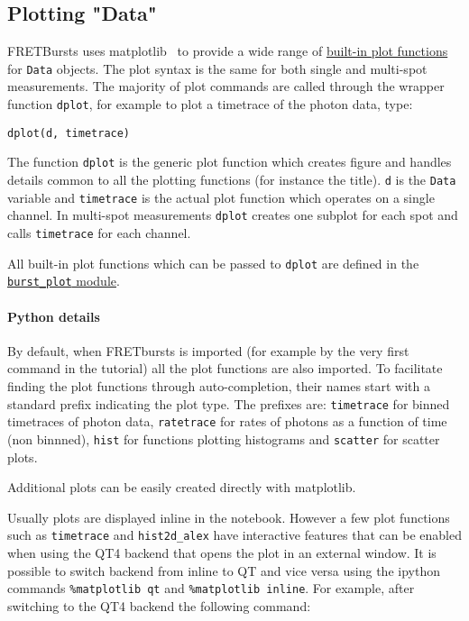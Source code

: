 \subsection{Plotting "Data"}
\label{sec:plotting}

FRETBursts uses matplotlib~\cite{2096e2a4-8f50-4519-bfb3-f796da201630} to
provide a wide range of
\href{http://fretbursts.readthedocs.org/en/latest/plots.html}{built-in plot functions}
for \verb|Data| objects.
The plot syntax is the same for both single and multi-spot measurements.
The majority of plot commands are called through the wrapper function
\verb|dplot|, for example to plot a timetrace of the photon data, type:

\begin{verbatim}
dplot(d, timetrace)
\end{verbatim}

The function \verb|dplot| is the generic plot function which creates figure
and handles details common to all the plotting functions (for instance the title).
\verb|d| is the \verb|Data| variable and \verb|timetrace| is the actual plot
function which operates on a single channel. In multi-spot measurements
\verb|dplot| creates one subplot for each spot and calls \verb|timetrace| for
each channel.

All built-in plot functions which can be passed to
\verb|dplot| are defined in the
\href{http://fretbursts.readthedocs.org/en/latest/plots.html}{\texttt{burst\_plot} module}.

\paragraph{Python details}

By default, when FRETbursts is imported (for example by the very first command
in the tutorial) all the plot functions are also imported.
To facilitate finding the plot functions through auto-completion,
their names start with a standard prefix indicating the
plot type. The prefixes are: \verb|timetrace| for binned timetraces
of photon data, \verb|ratetrace| for rates of photons as a function of time (non
binnned), \verb|hist| for functions plotting histograms and \verb|scatter| for
scatter plots.

Additional plots can be easily created directly with matplotlib.

Usually plots are displayed inline in the notebook. However a few plot functions
 such as \verb|timetrace| and \verb|hist2d_alex| have interactive features that
can be enabled when using the QT4 backend that opens the plot in an external
window. It is possible to switch backend from inline to QT and vice versa using
the ipython commands \verb|%matplotlib qt|
and \verb|%matplotlib inline|. For example, after switching to the QT4 backend
the following command:

